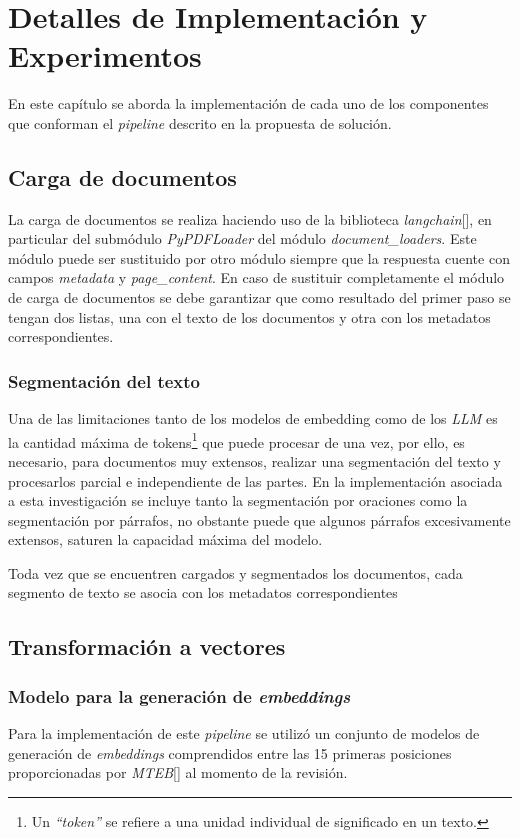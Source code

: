 \chapter{Detalles de Implementación y Experimentos}\label{chapter:implementation}
En este capítulo se aborda la implementación de cada uno de los componentes que conforman el \emph{pipeline}
descrito en la propuesta de solución.

\section{Carga de documentos}
La carga de documentos se realiza haciendo uso de la biblioteca \emph{langchain}[\cite{langchain}],
en particular del submódulo \emph{PyPDFLoader} del módulo \emph{document\_loaders}. Este módulo puede ser sustituido por otro módulo siempre que la respuesta cuente con campos \emph{metadata} y \emph{page\_content}. En caso de sustituir completamente el módulo de carga de documentos se debe garantizar que como resultado del primer paso se tengan dos listas, una con el texto de los documentos y otra con los metadatos correspondientes.
    \subsection{Segmentación del texto}
        Una de las limitaciones tanto de los modelos de embedding como de los \emph{LLM} es la cantidad máxima de tokens\footnote{Un \emph{“token”} se refiere a una unidad individual de significado en un texto.} que puede procesar de una vez, por ello, es necesario, para documentos muy extensos, realizar una segmentación del texto y procesarlos parcial e independiente de las partes.
        En la implementación asociada a esta investigación se incluye tanto la segmentación por oraciones como la segmentación por párrafos, no obstante puede que algunos párrafos excesivamente extensos, saturen la capacidad máxima del modelo.

Toda vez que se encuentren cargados y segmentados los documentos, cada segmento de texto se asocia con los metadatos correspondientes

\section{Transformación a vectores}
    \subsection{Modelo para la generación de \emph{embeddings}}
        Para la implementación de este \emph{pipeline} se utilizó un conjunto de modelos de generación de \emph{embeddings} comprendidos entre las 15 primeras posiciones proporcionadas por \emph{MTEB}[\cite{leaderboard}] al momento de la revisión.

